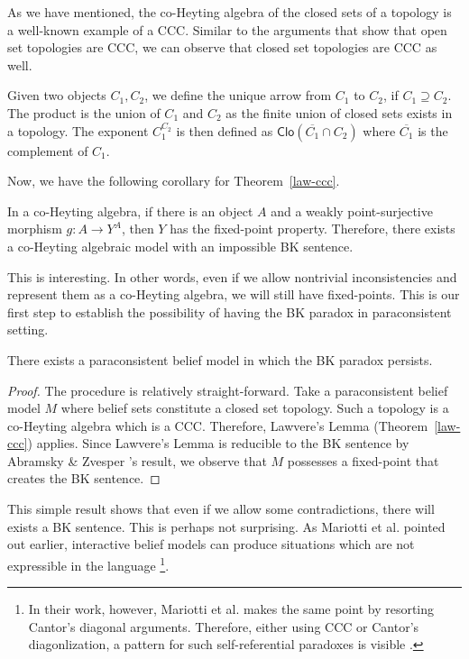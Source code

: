 \documentclass{article}
\begin{document}
\begin{ex}{\label{ex-coheyt}}
As we have mentioned, the co-Heyting algebra of the closed sets of a topology is a well-known example of a CCC. Similar to the arguments that show that open set topologies are CCC, we can observe that closed set topologies are CCC as well. 

Given two objects $C_{1}, C_{2}$, we define the unique arrow from $C_{1}$ to $C_{2}$, if $C_{1} \supseteq C_{2}$. The product is the union of $C_{1}$ and $C_{2}$ as the finite union of closed sets exists in a topology. The exponent $C_{1}^{C_{2}}$ is then defined as $\mathsf{Clo}(\overline{C_1} \cap C_{2})$ where $\overline{C_1}$ is the complement of $C_1$.
\end{ex}

Now, we have the following corollary for Theorem~\ref{law-ccc}.

\begin{cor}{\label{coheyt}}
In a co-Heyting algebra, if there is an object $A$ and a weakly point-surjective morphism $g: A \rightarrow Y^{A}$, then $Y$ has the fixed-point property. Therefore, there exists a co-Heyting algebraic model with an impossible BK sentence.

\end{cor}

This is interesting. In other words, even if we allow nontrivial inconsistencies and represent them as a co-Heyting algebra, we will still have fixed-points. This is our first step to establish the possibility of having the BK paradox in paraconsistent setting.

\begin{cor}
There exists a paraconsistent belief model in which the BK paradox persists.
\end{cor}

\begin{proof}
The procedure is relatively straight-forward. Take a paraconsistent belief model $M$ where belief sets constitute a closed set topology. Such a topology is a co-Heyting algebra which is a CCC. Therefore, Lawvere's Lemma (Theorem~\ref{law-ccc}) applies. Since Lawvere's Lemma is reducible to the BK sentence by Abramsky \& Zvesper 's result, we observe that $M$ possesses a fixed-point that creates the BK sentence.
\end{proof}

This simple result shows that even if we allow some contradictions, there will exists a BK sentence. This is perhaps not surprising. As Mariotti et al. pointed out earlier, interactive belief models can produce situations which are not expressible in the language \cite{mar}\footnote{In their work, however, Mariotti et al. makes the same point by resorting Cantor's diagonal arguments. Therefore, either using CCC or Cantor's diagonlization, a pattern for such self-referential paradoxes is visible \cite{yan}.}.
\end{document}
